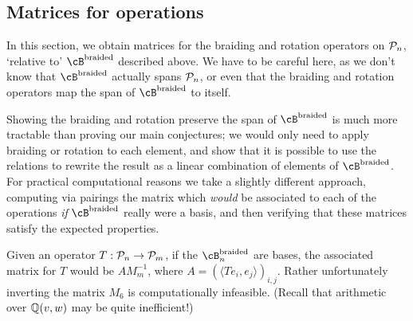 \documentclass[12pt]{amsart}
\begin{document}
\subsection{Matrices for operations}
In this section, we obtain matrices for the braiding and rotation operators on
 $\mathcal{P}_n$, `relative to' $\cB^{\text{braided}}$ described above.
We have to be careful here, as we don't know that $\cB^{\text{braided}}$
actually spans $\mathcal{P}_n$, or even that the braiding and rotation operators map
the span of $\cB^{\text{braided}}$ to itself.

Showing the braiding and rotation  preserve the span of $\cB^{\text{braided}}$ 
is much more tractable than proving our main conjectures; we would only need to
apply braiding or rotation to each element, and show that it
is possible to use the relations to rewrite the result as a linear combination
of elements of $\cB^{\text{braided}}$.  For practical computational reasons we 
take a slightly different approach,
computing via pairings the matrix which \emph{would} be associated to each of the
operations \emph{if} $\cB^{\text{braided}}$ really were a basis, and then
verifying that these matrices satisfy the expected properties.

Given an operator $T: \mathcal{P}_n \to \mathcal{P}_m$, if the $\cB^{\text{braided}}_n$
are bases, the associated matrix for $T$ would be $AM_m^{-1}$, where
$A = \left(\langle T e_i, e_j \rangle\right)_{i,j}$.
Rather unfortunately inverting the matrix $M_6$ is computationally
infeasible. (Recall that arithmetic over $\mathbb Q(v,w)$ may be quite inefficient!)
\end{document}
